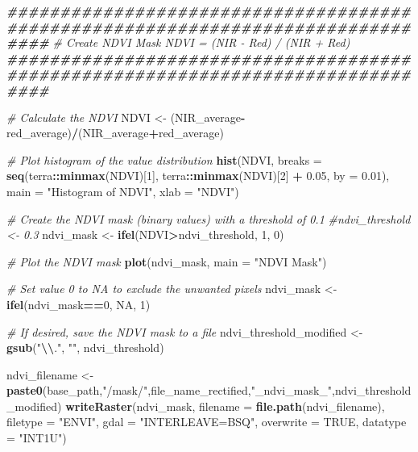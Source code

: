 \documentclass[
]{article}
\newenvironment{Shaded}{\begin{snugshade}}{\end{snugshade}}
\newcommand{\AttributeTok}[1]{\textcolor[rgb]{0.13,0.29,0.53}{#1}}
\newcommand{\CommentTok}[1]{\textcolor[rgb]{0.56,0.35,0.01}{\textit{#1}}}
\newcommand{\ConstantTok}[1]{\textcolor[rgb]{0.56,0.35,0.01}{#1}}
\newcommand{\DecValTok}[1]{\textcolor[rgb]{0.00,0.00,0.81}{#1}}
\newcommand{\DocumentationTok}[1]{\textcolor[rgb]{0.56,0.35,0.01}{\textbf{\textit{#1}}}}
\newcommand{\FloatTok}[1]{\textcolor[rgb]{0.00,0.00,0.81}{#1}}
\newcommand{\FunctionTok}[1]{\textcolor[rgb]{0.13,0.29,0.53}{\textbf{#1}}}
\newcommand{\NormalTok}[1]{#1}
\newcommand{\OtherTok}[1]{\textcolor[rgb]{0.56,0.35,0.01}{#1}}
\newcommand{\SpecialCharTok}[1]{\textcolor[rgb]{0.81,0.36,0.00}{\textbf{#1}}}
\newcommand{\StringTok}[1]{\textcolor[rgb]{0.31,0.60,0.02}{#1}}
\begin{document}
\begin{Shaded}
\begin{Highlighting}[]
\DocumentationTok{\#\#\#\#\#\#\#\#\#\#\#\#\#\#\#\#\#\#\#\#\#\#\#\#\#\#\#\#\#\#\#\#\#\#\#\#\#\#\#\#\#\#\#\#\#\#\#\#\#\#\#\#\#\#\#\#\#\#\#\#\#\#\#\#\#\#\#\#\#\#\#\#\#\#\#\#\#\#\#\#}
\CommentTok{\# Create NDVI Mask NDVI = (NIR {-} Red) / (NIR + Red)}
\DocumentationTok{\#\#\#\#\#\#\#\#\#\#\#\#\#\#\#\#\#\#\#\#\#\#\#\#\#\#\#\#\#\#\#\#\#\#\#\#\#\#\#\#\#\#\#\#\#\#\#\#\#\#\#\#\#\#\#\#\#\#\#\#\#\#\#\#\#\#\#\#\#\#\#\#\#\#\#\#\#\#\#\#}

\CommentTok{\# Calculate the NDVI}
\NormalTok{NDVI }\OtherTok{\textless{}{-}}\NormalTok{ (NIR\_average}\SpecialCharTok{{-}}\NormalTok{red\_average)}\SpecialCharTok{/}\NormalTok{(NIR\_average}\SpecialCharTok{+}\NormalTok{red\_average)}

\CommentTok{\# Plot histogram of the value distribution}
\FunctionTok{hist}\NormalTok{(NDVI, }\AttributeTok{breaks =} \FunctionTok{seq}\NormalTok{(terra}\SpecialCharTok{::}\FunctionTok{minmax}\NormalTok{(NDVI)[}\DecValTok{1}\NormalTok{], terra}\SpecialCharTok{::}\FunctionTok{minmax}\NormalTok{(NDVI)[}\DecValTok{2}\NormalTok{] }\SpecialCharTok{+} \FloatTok{0.05}\NormalTok{, }\AttributeTok{by =} \FloatTok{0.01}\NormalTok{),}
     \AttributeTok{main =} \StringTok{"Histogram of NDVI"}\NormalTok{, }\AttributeTok{xlab =} \StringTok{"NDVI"}\NormalTok{)}

\CommentTok{\# Create the NDVI mask (binary values) with a threshold of 0.1}
\CommentTok{\#ndvi\_threshold \textless{}{-} 0.3}
\NormalTok{ndvi\_mask }\OtherTok{\textless{}{-}} \FunctionTok{ifel}\NormalTok{(NDVI}\SpecialCharTok{\textgreater{}}\NormalTok{ndvi\_threshold, }\DecValTok{1}\NormalTok{, }\DecValTok{0}\NormalTok{)}

\CommentTok{\# Plot the NDVI mask}
\FunctionTok{plot}\NormalTok{(ndvi\_mask, }\AttributeTok{main =} \StringTok{"NDVI Mask"}\NormalTok{)}

\CommentTok{\# Set value 0 to NA to exclude the unwanted pixels}
\NormalTok{ndvi\_mask }\OtherTok{\textless{}{-}} \FunctionTok{ifel}\NormalTok{(ndvi\_mask}\SpecialCharTok{==}\DecValTok{0}\NormalTok{, }\ConstantTok{NA}\NormalTok{, }\DecValTok{1}\NormalTok{)}

\CommentTok{\# If desired, save the NDVI mask to a file}
\NormalTok{ndvi\_threshold\_modified }\OtherTok{\textless{}{-}} \FunctionTok{gsub}\NormalTok{(}\StringTok{"}\SpecialCharTok{\textbackslash{}\textbackslash{}}\StringTok{."}\NormalTok{, }\StringTok{""}\NormalTok{, ndvi\_threshold)}

\NormalTok{ndvi\_filename }\OtherTok{\textless{}{-}} \FunctionTok{paste0}\NormalTok{(base\_path,}\StringTok{"/mask/"}\NormalTok{,file\_name\_rectified,}\StringTok{"\_ndvi\_mask\_"}\NormalTok{,ndvi\_threshold\_modified)}
\FunctionTok{writeRaster}\NormalTok{(ndvi\_mask, }\AttributeTok{filename =} \FunctionTok{file.path}\NormalTok{(ndvi\_filename),}
            \AttributeTok{filetype =} \StringTok{"ENVI"}\NormalTok{,}
            \AttributeTok{gdal =} \StringTok{"INTERLEAVE=BSQ"}\NormalTok{,}
            \AttributeTok{overwrite =} \ConstantTok{TRUE}\NormalTok{,}
            \AttributeTok{datatype =} \StringTok{"INT1U"}\NormalTok{)}


\end{Highlighting}
\end{Shaded}
\end{document}
